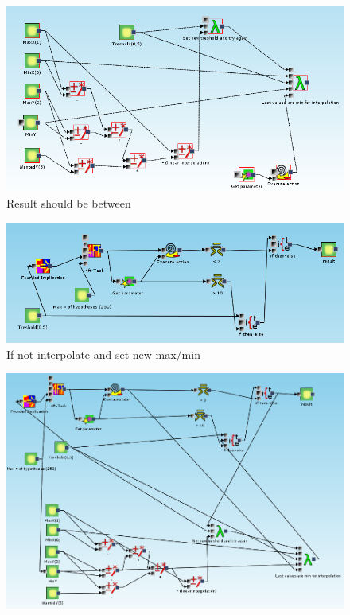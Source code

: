 \documentclass[a4paper,12pt]{book}
\begin{document}
\begin{figure}
	\includegraphics[width=13.72cm]{exampleMainRecursionPart}
	\caption{Result should be between}
\end{figure}

\begin{figure}
	\includegraphics[width=13.72cm]{exampleMainMiningPart}
	\caption{If not interpolate and set new max/min}
\end{figure}

\begin{figure}
	\includegraphics[width=13.72cm]{exampleWithoutInterpolationOnMax}
\end{figure}
\end{document}
